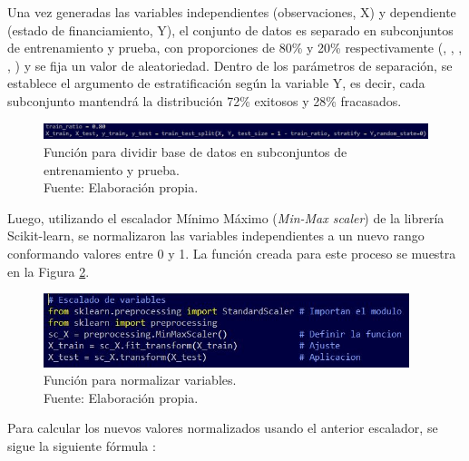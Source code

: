 Una vez generadas las variables independientes (observaciones, X) y dependiente (estado de financiamiento, Y), el conjunto de datos es separado en subconjuntos de entrenamiento y prueba, con proporciones de 80\% y 20\% respectivamente (\citeauthor{pr_yuan2016textanalytics}, \citeauthor{pr_yu2018deeplearning}, \citeauthor{pr_chen2019keywords_crowdfunding}, \citeauthor{pr_mitra2014phrases}, \citeauthor{pr_sawhney2016usingLT}) y se fija un valor de aleatoriedad. Dentro de los parámetros de separación, se establece el argumento de estratificación según la variable Y, es decir, cada subconjunto mantendrá la distribución 72\% exitosos y 28\% fracasados.

\begin{figure}[!ht]
	\begin{center}
		\includegraphics[width=1.00\textwidth]{4/figures/train_test_split.jpg}
		\caption[Función para dividir base de datos en subconjuntos de entrenamiento y prueba]{Función para dividir base de datos en subconjuntos de entrenamiento y prueba.\\
			Fuente: Elaboración propia.}
		\label{4:fig28}
	\end{center}
\end{figure}

Luego, utilizando el escalador Mínimo Máximo (\textit{Min-Max scaler}) de la librería Scikit-learn, se normalizaron las variables independientes a un nuevo rango conformando valores entre 0 y 1. La función creada para este proceso se muestra en la Figura \ref{4:fig29}.

\begin{figure}[!ht]
	\begin{center}
		\includegraphics[width=0.95\textwidth]{4/figures/metadata_scaler_function.jpg}
		\caption[Función para normalizar variables]{Función para normalizar variables.\\
			Fuente: Elaboración propia.}
		\label{4:fig29}
	\end{center}
\end{figure}

Para calcular los nuevos valores normalizados usando el anterior escalador, se sigue la siguiente fórmula \citep{tec_minmaxscaler,tec_scikitlearn,tec_datascaling}:

